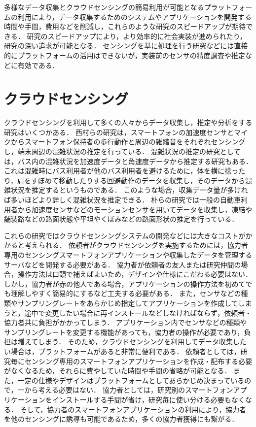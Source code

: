 多様なデータ収集とクラウドセンシングの簡易利用が可能となるプラットフォームの利用により，データ収集するためのシステムやアプリケーションを開発する時間や手間，費用などを削減し，これらのような研究のスピードアップが期待できる．
研究のスピードアップにより，より効率的に社会実装が進められたり，研究の深い追求が可能となる．
センシングを基に処理を行う研究などには直接的にプラットフォームの活用はできないが，実装前のセンサの精度調査や推定などに有効である．


\section{クラウドセンシング}
\label{sec:style}
クラウドセンシングを利用して多くの人々からデータ収集し，推定や分析をする研究はいくつかある．
西村らの研究\cite{ura}は，スマートフォンの加速度センサとマイクからスマートフォン保持者の歩行動作と周辺の雑踏音をそれぞれセンシングし，端末周辺の混雑状況の推定を行っている．
混雑状況の推定の研究としては，バス内の混雑状況を加速度データと角速度データから推定する研究\cite{hoso}もある．
これは混雑時にバス利用者が他のバス利用者を避けるために，体を横に捻ったり，肩をすぼめて移動したりする回避動作のデータを収集し，そのデータから混雑状況を推定するというものである．
このような場合，収集データ量が多ければ多いほどより詳しく混雑状況を推定できる．
朴らの研究\cite{paku}では一般の自動車利用者から加速度センサなどのモーションセンサを用いてデータを収集し，凍結や舗装路などの路面状態や平坦やくぼみなどの路面形状の推定を行っている．

これらの研究ではクラウドセンシングシステムの開発などには大きなコストがかかると考えられる．
依頼者がクラウドセンシングを実施するためには，協力者専用のセンシングスマートフォンアプリケーションや収集したデータを管理するサーバなどを開発する必要がある．
協力者が依頼者の友人または研究仲間の場合，操作方法は口頭で補えばよいため，デザインや仕様にこだわる必要はない．
しかし，協力者が赤の他人である場合，アプリケーションの操作方法を初めてでも理解しやすく簡易的にするなど工夫する必要がある．
また，センサなどの種類やサンプリングレートをあらかじめ指定してアプリケーションを作成してしまうと，途中で変更したい場合に再インストールなどしなければならず，依頼者・協力者共に負担がかかってしまう．
アプリケーション内でセンサなどの種類やサンプリングレートを変更する機能があっても，協力者の操作が必要であり，負担は増えてしまう．
そのため，クラウドセンシングを利用してデータ収集したい場合は，プラットフォームがあると非常に便利である．
依頼者としては，研究毎にセンシング専用のスマートフォンアプリケーションを作成・配布する必要がなくなるため，それらに費やしていた時間や手間の省略が可能となる．
また，一定の仕様やデザインはプラットフォームとしてあらかじめ決まっているので，一から考える必要はない．
協力者としては，研究別のスマートフォンアプリケーションをインストールする手間が省け，研究毎に使い分ける必要もなくなる．
そして，協力者のスマートフォンアプリケーションの利用により，協力者を他のセンシングに誘導も可能であるため，多くの協力者獲得にも繋がる．
